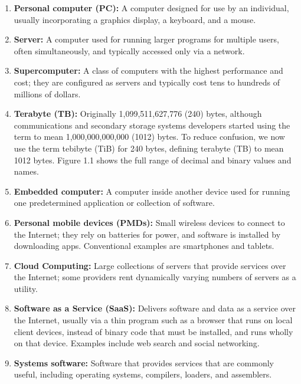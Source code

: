 
\begin{enumerate}
    \item \textbf{Personal computer (PC):} A computer designed for use by an individual, usually incorporating a graphics display, a keyboard, and a mouse.
    
    \item \textbf{Server:} A computer used for running larger programs for multiple users, often simultaneously, and typically accessed only via a network.
    
    \item \textbf{Supercomputer:} A class of computers with the highest performance and cost; they are configured as servers and typically cost tens to hundreds of millions of dollars.
    
    \item \textbf{Terabyte (TB):} Originally 1,099,511,627,776 (240) bytes, although communications and secondary storage systems developers started using the term to mean 1,000,000,000,000 (1012) bytes. To reduce confusion, we now use the term tebibyte (TiB) for 240 bytes, defining terabyte (TB) to mean 1012 bytes. Figure 1.1 shows the full range of decimal and binary values and names.
    
    \item \textbf{Embedded computer:} A computer inside another device used for running one predetermined application or collection of software.
    
    \item \textbf{Personal mobile devices (PMDs):} Small wireless devices to connect to the Internet; they rely on batteries for power, and software is installed by downloading apps. Conventional examples are smartphones and tablets.
    
    \item \textbf{Cloud Computing:} Large collections of servers that provide services over the Internet; some providers rent dynamically varying numbers of servers as a utility.
    
    \item \textbf{Software as a Service (SaaS):} Delivers software and data as a service over the Internet, usually via a thin program such as a browser that runs on local client devices, instead of binary code that must be installed, and runs wholly on that device. Examples include web search and social networking.
    
    \item \textbf{Systems software:} Software that provides services that are commonly useful, including operating systems, compilers, loaders, and assemblers.
    

\end{enumerate}
